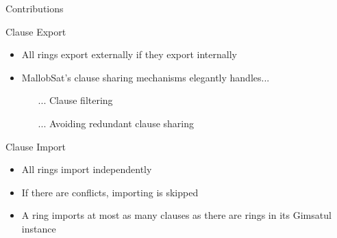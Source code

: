 \documentclass{beamer}
\begin{document}
\begin{frame}{Contributions}
    \begin{block}{Clause Export}
        \begin{itemize}
            \item All rings export externally if they export internally
            \item MallobSat's clause sharing mechanisms elegantly handles...
            \begin{itemize}
                \item[...] Clause filtering
                \item[...] Avoiding redundant clause sharing
            \end{itemize}
        \end{itemize}
    \end{block}

    \begin{block}{Clause Import}
        \begin{itemize}
            \item All rings import independently
            \item If there are conflicts, importing is skipped
            \item A ring imports at most as many clauses as there are rings in its Gimsatul instance
        \end{itemize}
    \end{block}
\end{frame}
\end{document}
